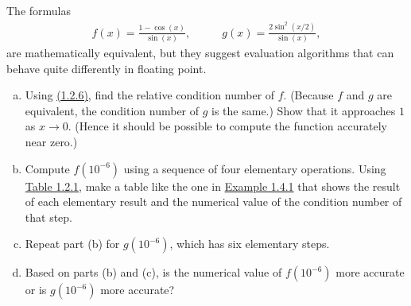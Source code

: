 \documentclass{article}
\newenvironment{problem}[2][Problem]{\begin{trivlist}
\item[\hskip \labelsep {\bfseries #1}\hskip \labelsep {\bfseries #2.}]}{\end{trivlist}}
\theoremstyle{definition}
\begin{document}
\begin{problem}{1.4.1}
    The formulas
    \begin{align*}
        f(x) = \frac{1 - \cos(x)}{\sin(x)}, &\qquad g(x) = \frac{2\sin^2(x/2)}{\sin(x)},
    \end{align*}
    are mathematically equivalent, but they suggest evaluation algorithms that can behave quite differently in floating point.
    \begin{enumerate}[(a)]
        \item Using \href{https://fncbook.com/conditioning#conditionderiv}{(1.2.6)}, find the relative condition number of $f$. (Because $f$ and $g$ are equivalent, the condition number of $g$ is the same.) Show that it approaches $1$ as $x \rightarrow 0$. (Hence it should be possible to compute the function accurately near zero.)
        \item Compute $f(10^{-6})$ using a sequence of four elementary operations. Using \href{https://fncbook.com/conditioning#table-condition-functions}{Table 1.2.1}, make a table like the one in \href{https://fncbook.com/stability/#demo-stability-quadbad}{Example 1.4.1} that shows the result of each elementary result and the numerical value of the condition number of that step.
        \item Repeat part (b) for $g(10^{-6})$, which has six elementary steps.
        \item Based on parts (b) and (c), is the numerical value of $f(10^{-6})$ more accurate or is $g(10^{-6})$ more accurate?
    \end{enumerate}
\end{problem}
\end{document}
